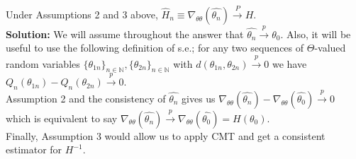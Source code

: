 \documentclass[11pt,letterpaper]{article}                  %
\begin{document}
\bigskip
\begin{problem}
Under Assumptions 2 and 3 above, $\hat{H}_n \equiv \nabla_{\theta\theta}(\widehat{\theta_n}) \overset{P}{\rightarrow} H$.\\

\textbf{Solution:} We will assume throughout the answer that $\widehat{\theta_n}\overset{p}{\rightarrow}\theta_0$. Also, it will be useful to use the following definition of s.e.; for any two sequences of $\Theta$-valued random variables $\{\theta_{1n}\}_{n\in\mathbb{N}}, \{\theta_{2n}\}_{n\in\mathbb{N}}$ with $d(\theta_{1n},\theta_{2n})\overset{p}{\rightarrow}0$ we have $Q_n(\theta_{1n}) - Q_n(\theta_{2n})\overset{p}{\rightarrow}0$.\\

Assumption 2 and the consistency of $\widehat{\theta_n}$ gives us $\nabla_{\theta\theta}(\widehat{\theta_n}) - \nabla_{\theta\theta}(\widehat{\theta_0}) \overset{p}{\rightarrow}0$ which is equivalent to say $\nabla_{\theta\theta}(\widehat{\theta_n}) \overset{p}{\rightarrow} \nabla_{\theta\theta}(\widehat{\theta_0}) = H(\theta_0)$.\\

Finally, Assumption 3 would allow us to apply CMT and get a consistent estimator for $H^{-1}$.
\end{problem}
\end{document}

